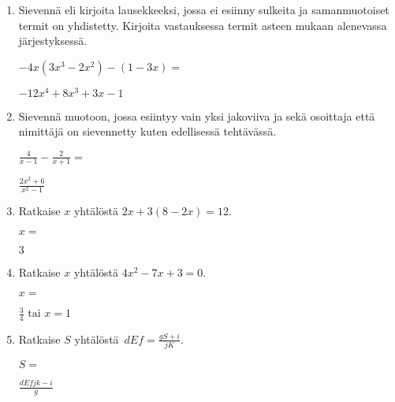\documentclass[finnish, a4paper, 12pt]{article}
\begin{document}
\begin{enumerate}[leftmargin=*]
		\vspace{8pt}
		
		\item %
		Sievennä eli kirjoita lausekkeeksi, jossa ei esiinny sulkeita ja 
		samanmuotoiset termit on yhdistetty. 
		Kirjoita vastauksessa termit asteen mukaan alenevassa järjestyksessä. 
		
		\(
		\displaystyle
		-4x(3x^3 - 2x^2) - (1 - 3x) = 
		\) %
		\begin{version:withAnswers}
		\( -12x^4 +8x^3 +3x -1 \)
		\end{version:withAnswers}
		
		\vspace{8pt}
		
		\item %
		Sievennä %
		muotoon, jossa esiintyy vain yksi jakoviiva ja sekä osoittaja
		että nimittäjä on sievennetty kuten edellisessä tehtävässä.
		
		\(
		\displaystyle
		\frac{4}{x-1}- \frac{2}{x + 1} =
		\) %
		\begin{version:withAnswers}
		\( \frac{2x^2 + 6}{x^2  - 1} \)
		\end{version:withAnswers}
		
		\vspace{8pt}
		
		\item %
		Ratkaise \(x\) yhtälöstä \(2x + 3(8 - 2x) = 12\).
		
		\(
		x = 
		\)	%
		\begin{version:withAnswers}
		 \( 3 \)
		\end{version:withAnswers}
		\vspace{8pt}
		
		\item %
		Ratkaise \(x\) yhtälöstä \(4 x^2  - 7 x + 3= 0\).
		
		\(
		x = 		
		\)	%
		
		\begin{version:withAnswers}
		\(\frac{3}{4} \text{  tai } x = 1\)
		\end{version:withAnswers}
		\vspace{8pt}
		
		\item %
		Ratkaise \(S\) yhtälöstä 
		\(
		\displaystyle \,
		dEf = \frac{gS+i}{jK} .
		\)	
		
		\(
		S = 
		\) %
		\begin{version:withAnswers}
		\( \frac{dEfjk-i}{g}\)
		\end{version:withAnswers}
		
	\end{enumerate}
	
	
\end{document}
